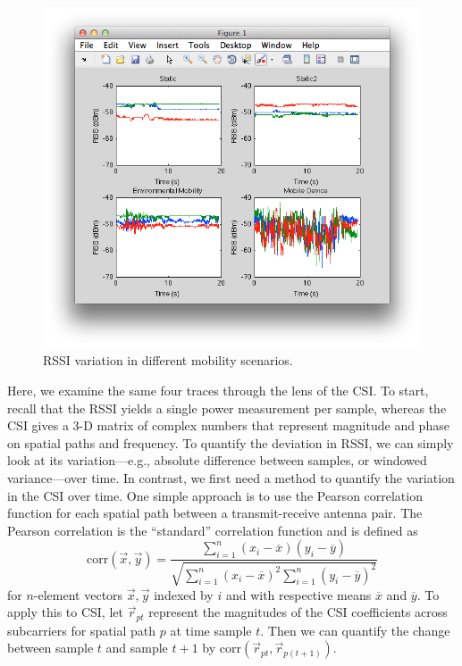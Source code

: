 \begin{figure}[htp]
	\centering
	\includegraphics[width=\textwidth]{figures/esnr/mobility_rssi.png}
	\caption{\label{fig:mobility_rssi}RSSI variation in different mobility scenarios.}
\end{figure}

 Here, we examine the same four traces through the lens of the CSI\@. To start, recall that the RSSI yields a single power measurement per sample, whereas the CSI gives a 3-D matrix of complex numbers that represent magnitude and phase on spatial paths and frequency. To quantify the deviation in RSSI, we can simply look at its variation---e.g., absolute difference between samples, or windowed variance---over time. In contrast, we first need a method to quantify the variation in the CSI over time. One simple approach is to use the Pearson correlation function for each spatial path between a transmit-receive antenna pair. The Pearson correlation is the ``standard'' correlation function and is defined as
\[
\text{corr}(\vec{x},\vec{y}) = \frac{\sum_{i=1}^n(x_i-\overline{x})(y_i-\overline{y})}{\sqrt{\sum_{i=1}^n(x_i-\overline{x})^2 \sum_{i=1}^n(y_i-\overline{y})^2}}
\]
for $n$-element vectors $\vec{x},\vec{y}$ indexed by $i$ and with respective means $\overline{x}$ and $\overline{y}$. To apply this to CSI, let $\vec{r}_{pt}$ represent the magnitudes of the CSI coefficients across subcarriers for spatial path $p$ at time sample $t$. Then we can quantify the change between sample $t$ and sample $t+1$ by $\text{corr}(\vec{r}_{pt},\vec{r}_{p(t+1)})$.

